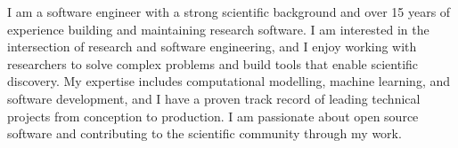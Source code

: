 
\begin{cvparagraph}
I am a software engineer with a strong scientific background and over 15 years of experience building and maintaining research software. I am interested in the intersection of research and software engineering, and I enjoy working with researchers to solve complex problems and build tools that enable scientific discovery. My expertise includes computational modelling, machine learning, and software development, and I have a proven track record of leading technical projects from conception to production. I am passionate about open source software and contributing to the scientific community through my work.
\end{cvparagraph}
